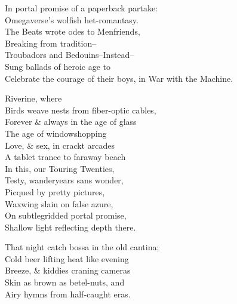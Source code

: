 In portal promise of a paperback partake: \\
Omegaverse's wolfish het-romantasy. \\
The Beats wrote odes to Menfriends, \\
Breaking from tradition-- \\
Troubadors and Bedouins--Instead-- \\
Sung ballads of heroic age to \\
Celebrate the courage of their boys, in War with the Machine.

\secdiv

Riverine, where \\
Birds weave nests from fiber-optic cables, \\
Forever \& always in the age of glass \\
The age of windowshopping \\
Love, \& sex, in crackt arcades \\
A tablet trance to faraway beach \\
In this, our Touring Twenties, \\
Testy, wanderyears sans wonder, \\
Picqued by pretty pictures, \\
Waxwing slain on false azure, \\
On subtlegridded portal promise, \\
Shallow light reflecting depth there.

\secdiv

That night catch bossa in the old cantina; \\
Cold beer lifting heat like evening \\
Breeze, \& kiddies craning cameras \\
Skin as brown as betel-nuts, and \\
Airy hymns from half-caught eras.

